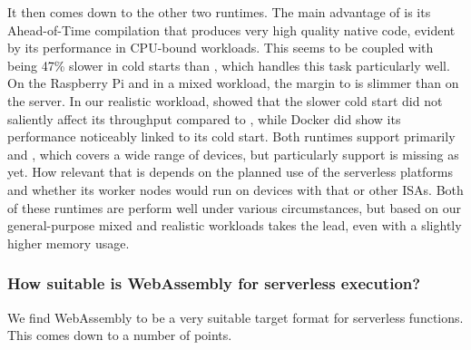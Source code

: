 It then comes down to the other two runtimes. The main advantage of  is its Ahead-of-Time compilation that produces very high quality native code, evident by its performance in CPU-bound workloads. This seems to be coupled with being 47\% slower in cold starts than , which handles this task particularly well. On the Raspberry 
Pi and in a mixed workload, the margin to  is slimmer than on the server.
In our realistic workload,  showed that the slower cold start did not saliently affect its throughput compared to , while Docker did show its performance noticeably linked to its cold start.
Both runtimes support primarily  and , which covers a wide range of devices, but particularly  support is missing as yet. How relevant that is depends on the planned use of the serverless platforms and whether its worker nodes would run on devices with that or other ISAs.
Both of these runtimes are perform well under various circumstances, but based on our general-purpose mixed and realistic workloads  takes the lead, even with a slightly higher memory usage.



\subsubsection*{How suitable is WebAssembly for serverless execution?}

We find WebAssembly to be a very suitable target format for serverless functions. This comes down to a number of points.


